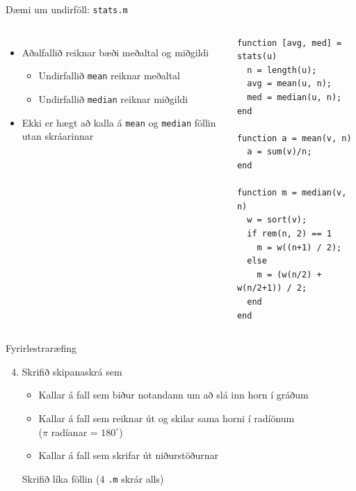 \documentclass{beamer}
\begin{document}
\begin{frame}[fragile]{Dæmi um undirföll: \texttt{stats.m}}
\begin{columns}
\begin{itemize}
 \item Aðalfallið reiknar bæði meðaltal og miðgildi
 \begin{itemize}
  \item Undirfallið \texttt{mean} reiknar meðaltal
  \item Undirfallið \texttt{median} reiknar miðgildi
 \end{itemize}
 \item Ekki er hægt að kalla á \texttt{mean} og \texttt{median} föllin utan skráarinnar
\end{itemize}

\begin{verbatim}
function [avg, med] = stats(u)
  n = length(u);
  avg = mean(u, n);
  med = median(u, n);
end

function a = mean(v, n)
  a = sum(v)/n;
end

function m = median(v, n)
  w = sort(v);
  if rem(n, 2) == 1
    m = w((n+1) / 2);
  else
    m = (w(n/2) + w(n/2+1)) / 2;
  end
end
\end{verbatim}
\end{columns}
\end{frame}

\begin{frame}{Fyrirlestraræfing}
\begin{enumerate}
\setcounter{enumi}{3}
 \item Skrifið skipanaskrá sem
 \begin{itemize}
  \item Kallar á fall sem biður notandann um að slá inn horn í gráðum
  \item Kallar á fall sem reiknar út og skilar sama horni í radíönum\\ ($\pi$ radíanar = $180^\circ$)
  \item Kallar á fall sem skrifar út niðurstöðurnar
 \end{itemize} 
 
 Skrifið líka föllin (4 \texttt{.m} skrár alls)
\end{enumerate}

\end{frame}
\end{document}
